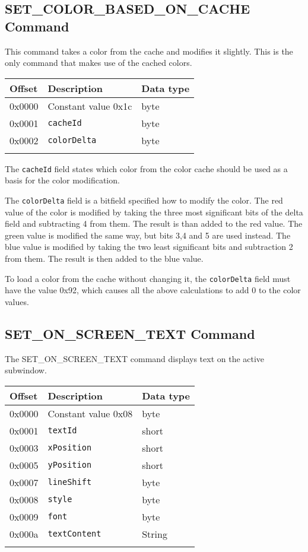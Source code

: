 \documentclass{article}
\newcommand{\field}[1]{\textcolor{fieldColor}{\texttt{#1}}}
\newenvironment{bytelisting}
{\ttfamily \begin{center} \begin{tabular}{l l l} Offset & Description & Data type \\ \hline}
{\normalfont \end{tabular} \end{center}}
\begin{document}
\subsection{SET\_COLOR\_BASED\_ON\_CACHE Command}
This command takes a color from the cache and modifies it slightly. This is the only command that makes use of the cached colors.

\begin{bytelisting}
0x0000 & Constant value 0x1c & byte \\
0x0001 & \field{cacheId} & byte \\
0x0002 & \field{colorDelta} & byte \\
\end{bytelisting}

The \field{cacheId} field states which color from the color cache should be used as a basis for the color modification.

The \field{colorDelta} field is a bitfield specified how to modify the color. The red value of the color is modified by taking the three most significant bits of the delta field and subtracting 4 from them.
The result is than added to the red value. The green value is modified the same way, but bits 3,4 and 5 are used instead. The blue value is modified by taking the two least 
significant bits and subtraction 2 from them. The result is then added to the blue value.

To load a color from the cache without changing it, the \field{colorDelta} field must have the value 0x92, which causes all the above calculations to add 0 to the color values.

\subsection{SET\_ON\_SCREEN\_TEXT Command}
The SET\_ON\_SCREEN\_TEXT command displays text on the active subwindow.

\begin{bytelisting}
0x0000 & Constant value 0x08 & byte \\
0x0001 & \field{textId} & short \\
0x0003 & \field{xPosition} & short \\
0x0005 & \field{yPosition} & short \\
0x0007 & \field{lineShift} & byte \\
0x0008 & \field{style} & byte \\
0x0009 & \field{font} & byte \\
0x000a & \field{textContent} & String\\
\end{bytelisting}
\end{document}
